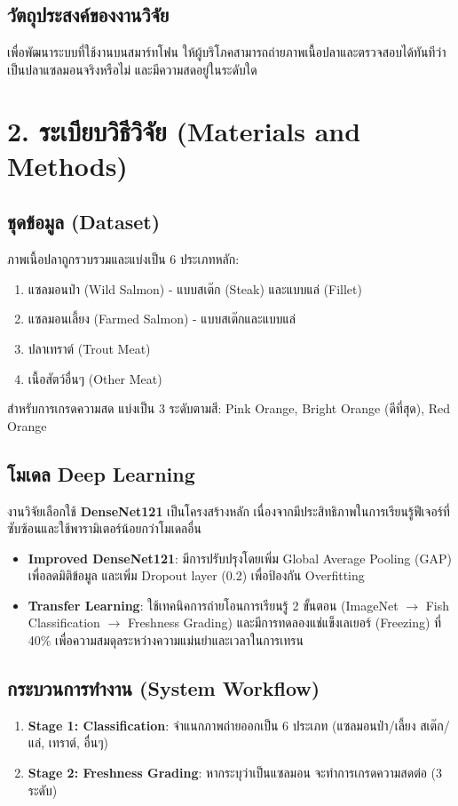 \documentclass[a4paper,12pt]{article}
\begin{document}
\subsection{วัตถุประสงค์ของงานวิจัย}
เพื่อพัฒนาระบบที่ใช้งานบนสมาร์ทโฟน ให้ผู้บริโภคสามารถถ่ายภาพเนื้อปลาและตรวจสอบได้ทันทีว่าเป็นปลาแซลมอนจริงหรือไม่ และมีความสดอยู่ในระดับใด

\section{2. ระเบียบวิธีวิจัย (Materials and Methods)}

\subsection{ชุดข้อมูล (Dataset)}
ภาพเนื้อปลาถูกรวบรวมและแบ่งเป็น 6 ประเภทหลัก:
\begin{enumerate}
    \item แซลมอนป่า (Wild Salmon) - แบบสเต๊ก (Steak) และแบบแล่ (Fillet)
    \item แซลมอนเลี้ยง (Farmed Salmon) - แบบสเต๊กและแบบแล่
    \item ปลาเทราต์ (Trout Meat)
    \item เนื้อสัตว์อื่นๆ (Other Meat)
\end{enumerate}
สำหรับการเกรดความสด แบ่งเป็น 3 ระดับตามสี: Pink Orange, Bright Orange (ดีที่สุด), Red Orange

\subsection{โมเดล Deep Learning}
งานวิจัยเลือกใช้ \textbf{DenseNet121} เป็นโครงสร้างหลัก เนื่องจากมีประสิทธิภาพในการเรียนรู้ฟีเจอร์ที่ซับซ้อนและใช้พารามิเตอร์น้อยกว่าโมเดลอื่น
\begin{itemize}
    \item \textbf{Improved DenseNet121}: มีการปรับปรุงโดยเพิ่ม Global Average Pooling (GAP) เพื่อลดมิติข้อมูล และเพิ่ม Dropout layer (0.2) เพื่อป้องกัน Overfitting
    \item \textbf{Transfer Learning}: ใช้เทคนิคการถ่ายโอนการเรียนรู้ 2 ขั้นตอน (ImageNet $\rightarrow$ Fish Classification $\rightarrow$ Freshness Grading) และมีการทดลองแช่แข็งเลเยอร์ (Freezing) ที่ 40\% เพื่อความสมดุลระหว่างความแม่นยำและเวลาในการเทรน
\end{itemize}

\subsection{กระบวนการทำงาน (System Workflow)}
\begin{enumerate}
    \item \textbf{Stage 1: Classification}: จำแนกภาพถ่ายออกเป็น 6 ประเภท (แซลมอนป่า/เลี้ยง สเต๊ก/แล่, เทราต์, อื่นๆ)
    \item \textbf{Stage 2: Freshness Grading}: หากระบุว่าเป็นแซลมอน จะทำการเกรดความสดต่อ (3 ระดับ)
\end{enumerate}
\end{document}
